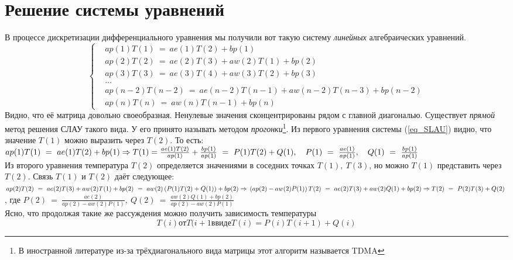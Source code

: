 \documentclass[oneside, final, 14pt]{report}
\begin{document}
\section{Решение системы уравнений}
В процессе дискретизации дифференциального уравнения мы получили вот такую систему \emph{линейных} алгебраических уравнений.
\begin{equation} 
\left\{\begin{aligned} 
& ap(1)T(1) \ = \ ae(1)T(2) + bp(1) \\
& ap(2)T(2) \ = \ ae(2)T(3) + aw(2)T(1) + bp(2) \\
& ap(3)T(3) \ = \ ae(3)T(4) + aw(3)T(2) + bp(3) \\
& \dots \\
& ap(n-2)T(n-2) \ = \ ae(n-2)T(n-1) + aw(n-2)T(n-3) + bp(n-2) \\
& ap(n)T(n) \ = \ aw(n)T(n-1) + bp(n) 
\end{aligned}\right.
\label{eq_SLAU}
\end{equation}
Видно, что её матрица довольно своеобразная. Ненулевые значения сконцентрированы рядом с главной диагональю. Существует \emph{прямой} метод решения СЛАУ такого вида. У его принято называть методом \emph{прогонки}\footnote{В иностранной литературе из-за трёхдиагонального вида матрицы этот алгоритм называется TDMA}.
Из первого уравнения системы (\ref{eq_SLAU}) видно, что значение $T(1)$ можно выразить через $T(2)$. То есть:\\
\( ap(1)T(1) \ = \ ae(1)T(2) + bp(1) \Rightarrow \\ 
T(1) = \frac{ae(1)T(2)}{ap(1)} + \frac{bp(1)}{ap(1)} \ = \ P(1)T(2) + Q(1), \quad P(1)\ = \ \frac{ae(1)}{ap(1)}, \quad Q(1) \ = \ \frac{bp(1)}{ap(1)}\)  \\
Из второго уравнения температура $T(2)$ определяется значениями в соседних точках $T(1), \ T(3)$, но можно $T(1)$ представить через $T(2)$. Связь $T(1)$ и $T(2)$ даёт следующее: \\
\( ap(2)T(2) \ = \ ae(2)T(3) + aw(2)T(1) + bp(2) \ = \ aw(2)\left(P(1)T(2) + Q(1) \right) + bp(2) \Rightarrow  \\
\left(ap(2) - aw(2)P(1)\right)T(2) \ = \ ae(2)T(3) + aw(2)Q(1) + bp(2) \Rightarrow \\
T(2) \ = \ P(2)T(3) + Q(2) \ \), где $P(2) \ = \ \frac{ae(2)}{ap(2) - aw(2)P(1)}, \ Q(2) \ = \ \frac{aw(2)Q(1) + bp(2)}{ap(2) - aw(2)P(1)}$ \\
Ясно, что продолжая такие же рассуждения можно получить зависимость температуры 
\begin{equation}
T(i) от T(i+1 в виде T(i) = P(i)T(i+1) + Q(i) 
\label{eq_TDMA_Ti_1}
\end{equation}
\end{document}
